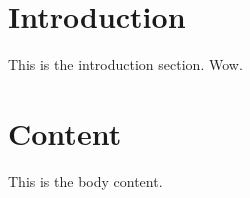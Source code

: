 \documentclass[11pt]{article}
\begin{document}
\pagestyle{empty} 
\setlength{\baselineskip}{12.6pt} %

\section{Introduction}
This is the introduction section. Wow. \cite{matthis2018}

\section{Content}
This is the body content.

\newpage
\printbibliography
\end{document}
